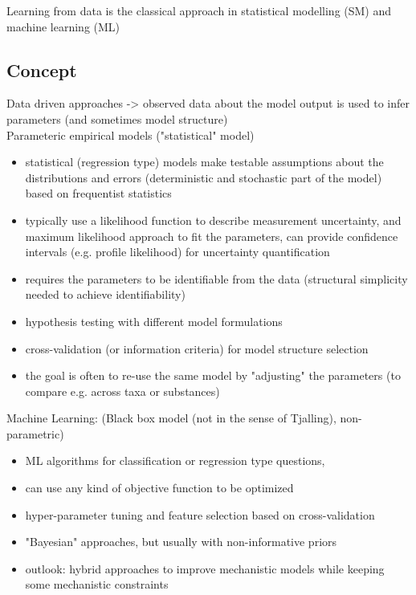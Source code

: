 \documentclass [english,11pt]{article} %
\begin{document}
\noindent
Learning from data is the classical approach in statistical modelling (SM) and  machine learning (ML)\\


\noindent

\subsection*{Concept}

Data driven approaches
-> observed data about the model output is used to infer parameters (and sometimes model structure)\\

\noindent
Parameteric empirical models ("statistical" model)
\begin{itemize}
\item statistical (regression type) models make testable assumptions about the distributions and errors (deterministic and stochastic part of the model) based on frequentist statistics
\item typically use a \gls{likelihood function} to describe measurement uncertainty, and maximum likelihood approach to fit the parameters, can provide confidence intervals (e.g. profile likelihood) for uncertainty quantification
\item requires the parameters to be identifiable from the data (structural simplicity needed to achieve identifiability)
\item hypothesis testing with different model formulations
\item cross-validation (or information criteria) for model structure selection
\item the goal is often to re-use the same model by "adjusting" the parameters (to compare e.g. across taxa or substances)
\end{itemize}

\noindent
Machine Learning: (Black box model (not in the sense of Tjalling), non-parametric) 
\begin{itemize}
\item ML algorithms for classification or regression type questions,
\item can use any kind of objective function to be optimized
\item hyper-parameter tuning and feature selection based on cross-validation
\item "Bayesian" approaches, but usually with non-informative priors 
\item outlook: hybrid approaches to improve mechanistic models while keeping some mechanistic constraints
\end{itemize}
\end{document}
